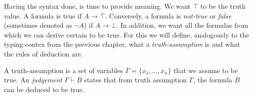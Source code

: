 Having the syntax done, is time to provide meaning. We want $\top$ to be the truth value. A formula is true if $A \to \top$. Conversely, a formula is \emph{not-true} or \emph{false} (sometimes denoted as $\neg A$) if $ A \to \bot$. In addition, we want all the formulas from which we can derive certain to be true. For this we will define, analogously to the typing-contex from the previous chapter, what a \emph{truth-assumption} is and  what the rules of deduction are.

\begin{definition}
 A truth-assumption is a set of variables $\Gamma = \{x_1,...,x_n\}$ that we assume to be true. An \emph{judgement} $\Gamma \vdash B$ states that from truth assumption $\Gamma$, the formula $B$ can be deduced to be true. 
\end{definition}

